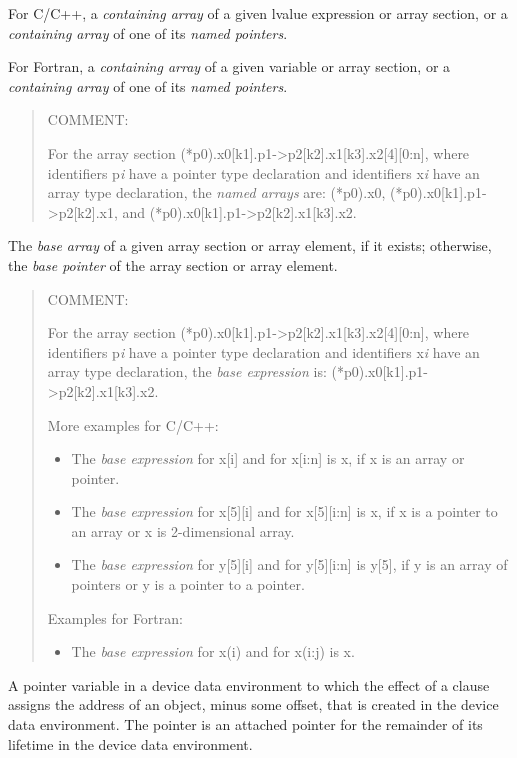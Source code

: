 \glossarydefstart
For C/C++, a \emph{containing array} of a given lvalue expression or array 
section, or a \emph{containing array} of one of its \emph{named pointers}.

For Fortran, a \emph{containing array} of a given variable or array section, or
a \emph{containing array} of one of its \emph{named pointers}.

\begin{quote}
COMMENT: 

For the array section
(*p0).x0[k1].p1->p2[k2].x1[k3].x2[4][0:n],
where identifiers p\emph{i} have a pointer type declaration
and identifiers x\emph{i} have an array type declaration, 
the \emph{named arrays} are:
(*p0).x0,
    (*p0).x0[k1].p1->p2[k2].x1,
and 
(*p0).x0[k1].p1->p2[k2].x1[k3].x2.
\end{quote}

\glossarydefend

\glossarydefstart
The \emph{base array} of a given array section or array element, if
it exists; otherwise, the \emph{base pointer} of the array section or array
element.

\begin{quote}
COMMENT: 

For the array section
(*p0).x0[k1].p1->p2[k2].x1[k3].x2[4][0:n],
where identifiers p\emph{i} have a pointer type declaration and
identifiers x\emph{i} have an array type declaration, the
\emph{base expression} is:
(*p0).x0[k1].p1->p2[k2].x1[k3].x2.

More examples for C/C++:
\begin{itemize}
\item The \emph{base expression} for x[i] and for 
    x[i:n] is x, if x is an array or pointer.
\item The \emph{base expression} for x[5][i] and for x[5][i:n] is x, if x is a
    pointer to an array or x is 2-dimensional array.
\item The \emph{base expression} for y[5][i] and for y[5][i:n] is y[5], if
    y is an array of pointers or y is a pointer to a pointer.
\end{itemize}
Examples for Fortran:
\begin{itemize}
\item The \emph{base expression} for x(i) and for x(i:j) is x.
\end{itemize}
\end{quote}
\glossarydefend


\glossarydefstart
A pointer variable in a device data environment to which the effect of a
 clause assigns the address of an object, minus some offset,  that
is created in the device data environment. The pointer is an attached pointer
for the remainder of its lifetime in the device data environment.
\glossarydefend
\bigskip

